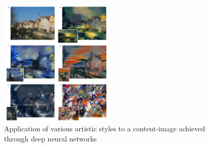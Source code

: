 \documentclass[a4paper]{article}
\begin{document}
\begin{figure}
\centering
\includegraphics[width=0.5\textwidth]{nn_art_styles.png}
\caption{\label{fig:nn_art_styles} Application of various artistic styles to a content-image achieved through deep neural networks \cite{Gatys2015AStyle}} 
\end{figure}
\end{document}
